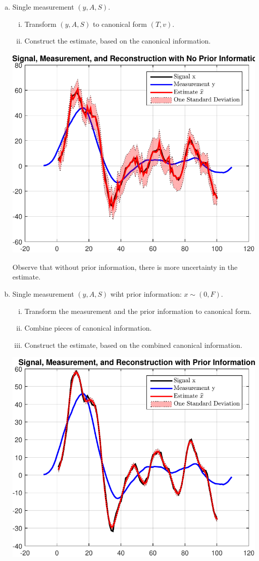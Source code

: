 \documentclass{homework}
\begin{document}
\begin{enumerate}[(a)]
  \item Single measurement $(y,A,S)$.
  \begin{enumerate}[i.]
    \item Transform $(y,A,S)$ to canonical form $(T,v)$.
    \item Construct the estimate, based on the canonical information.
  \end{enumerate}



\begin{center}\includegraphics[width=.5\textwidth]{problem3a.pdf}\end{center}

  Observe that without prior information, there is more uncertainty in the estimate.  

  \item Single measurement $(y,A,S)$ wiht prior information: $x\sim (0,F)$.
  \begin{enumerate}[i.]
    \item Transform the measurement and the prior information to canonical form.
    \item Combine pieces of canonical information.
    \item Construct the estimate, based on the combined canonical information.
  \end{enumerate}



\begin{center}\includegraphics[width=.5\textwidth]{problem3b.pdf}\end{center}


\end{enumerate}
\end{document}
